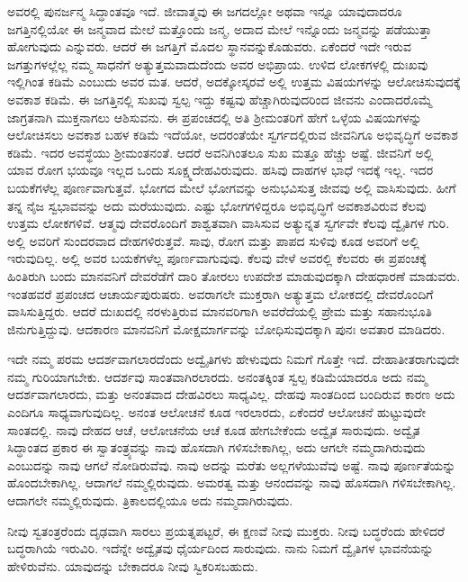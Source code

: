 ಅವರಲ್ಲಿ ಪುನರ್ಜನ್ಮ ಸಿದ್ಧಾಂತವೂ ಇದೆ. ಜೀವಾತ್ಮವು ಈ ಜಗದಲ್ಲೋ ಅಥವಾ ಇನ್ನೂ ಯಾವುದಾದರೂ ಜಗತ್ತಿನಲ್ಲಿಯೋ ಈ ಜನ್ಮವಾದ ಮೇಲೆ ಮತ್ತೊಂದು ಜನ್ಮ, ಅದಾದ ಮೇಲೆ ಇನ್ನೊಂದು ಜನ್ಮವನ್ನು ಪಡೆಯುತ್ತಾ ಹೋಗುವುದು ಎನ್ನುವರು. ಆದರೆ ಈ ಜಗತ್ತಿಗೆ ಮೊದಲ ಸ್ಥಾನವನ್ನುಕೊಡುವರು. ಏಕೆಂದರೆ ಇದೇ ಇರುವ ಜಗತ್ತುಗಳಲ್ಲೆಲ್ಲ ನಮ್ಮ ಸಾಧನೆಗೆ ಅತ್ಯುತ್ತಮವಾದುದೆಂದು ಅವರ ಅಭಿಪ್ರಾಯ. ಉಳಿದ ಲೋಕಗಳಲ್ಲಿ ದುಃಖವು ಇಲ್ಲಿಗಿಂತ ಕಡಿಮೆ ಎಂಬುದು ಅವರ ಮತ. ಆದರೆ, ಅದಕ್ಕೋಸ್ಕರವೆ ಅಲ್ಲಿ ಉತ್ತಮ ವಿಷಯಗಳನ್ನು ಆಲೋಚಿಸುವುದಕ್ಕೆ ಅವಕಾಶ ಕಡಿಮೆ. ಈ ಜಗತ್ತಿನಲ್ಲಿ ಸುಖವು ಸ್ವಲ್ಪ ಇದ್ದು ಕಷ್ಟವು ಹೆಚ್ಚಾಗಿರುವುದರಿಂದ ಜೀವನು ಎಂದಾದರೊಮ್ಮೆ ಜಾಗ್ರತನಾಗಿ ಮುಕ್ತನಾಗಲು ಆಶಿಸುವನು. ಈ ಪ್ರಪಂಚದಲ್ಲಿ ಅತಿ ಶ‍್ರೀಮಂತರಿಗೆ ಹೇಗೆ ಒಳ್ಳೆಯ ವಿಷಯಗಳನ್ನು ಆಲೋಚಿಸಲು ಅವಕಾಶ ಬಹಳ ಕಡಿಮೆ ಇದೆಯೋ, ಅದರಂತೆಯೇ ಸ್ವರ್ಗದಲ್ಲಿರುವ ಜೀವನಿಗೂ ಅಭಿವೃದ್ಧಿಗೆ ಅವಕಾಶ ಕಡಿಮೆ. ಇದರ ಅವಸ್ಥೆಯು ಶ‍್ರೀಮಂತನಂತೆ. ಆದರೆ ಅವನಿಗಿಂತಲೂ ಸುಖ ಮತ್ತೂ ಹೆಚ್ಚು ಅಷ್ಟೆ. ಜೀವನಿಗೆ ಅಲ್ಲಿ ಯಾವ ರೋಗ ಭಯವೂ ಇಲ್ಲದ ಒಂದು ಸೂಕ್ಷ್ಮದೇಹವಿರುವುದು. ಹಸಿವು ದಾಹಗಳ ಭಾಧೆ ಇದಕ್ಕೆ ಇಲ್ಲ. ಇದರ ಬಯಕೆಗಳೆಲ್ಲ ಪೂರ್ಣವಾಗುತ್ತವೆ. ಭೋಗದ ಮೇಲೆ ಭೋಗವನ್ನು ಅನುಭವಿಸುತ್ತ ಜೀವವು ಅಲ್ಲಿ ವಾಸಿಸುವುದು. ಹೀಗೆ ತನ್ನ ನೈಜ ಸ್ವಭಾವವನ್ನು ಅದು ಮರೆಯುವುದು. ಎಷ್ಟು ಭೋಗಗಳಿದ್ದರೂ ಅಭಿವೃದ್ಧಿಗೆ ಅವಕಾಶವಿರುವ ಕೆಲವು ಉತ್ತಮ ಲೋಕಗಳಿವೆ. ಆತ್ಮವು ದೇವರೊಂದಿಗೆ ಶಾಶ್ವತವಾಗಿ ವಾಸಿಸುವ ಅತ್ಯುನ್ನತ ಸ್ವರ್ಗವೇ ಕೆಲವು ದ್ವೈತಿಗಳ ಗುರಿ. ಅಲ್ಲಿ ಅವರಿಗೆ ಸುಂದರವಾದ ದೇಹಗಳಿರುತ್ತವೆ. ಸಾವು, ರೋಗ ಮತ್ತು ಪಾಪದ ಸುಳಿವು ಕೂಡ ಅವರಿಗೆ ಅಲ್ಲಿ ಇರುವುದಿಲ್ಲ. ಅಲ್ಲಿ ಅವರ ಬಯಕೆಗಳೆಲ್ಲ ಪೂರ್ಣವಾಗುವುವು. ಕೆಲವು ವೇಳೆ ಅವರಲ್ಲಿ ಕೆಲವರು ಈ ಪ್ರಪಂಚಕ್ಕೆ ಹಿಂತಿರುಗಿ ಬಂದು ಮಾನವನಿಗೆ ದೇವರೆಡೆಗೆ ದಾರಿ ತೋರಲು ಉಪದೇಶ ಮಾಡುವುದಕ್ಕಾಗಿ ದೇಹಧಾರಣೆ ಮಾಡುವರು. ಇಂತಹವರೆ ಪ್ರಪಂಚದ ಆಚಾರ್ಯಪುರುಷರು. ಅವರಾಗಲೇ ಮುಕ್ತರಾಗಿ ಅತ್ಯುತ್ತಮ ಲೋಕದಲ್ಲಿ ದೇವರೊಂದಿಗೆ ವಾಸಿಸುತ್ತಿದ್ದರು. ಆದರೆ ದುಃಖದಲ್ಲಿ ನರಳುತ್ತಿರುವ ಮಾನವರಿಗಾಗಿ ಅವರೆದೆಯಲ್ಲಿ ಪ್ರೇಮ ಮತ್ತು ಸಹಾನುಭೂತಿ ಜಿನುಗುತ್ತಿದ್ದುವು. ಆದಕಾರಣ ಮಾನವನಿಗೆ ಮೋಕ್ಷಮಾರ್ಗವನ್ನು ಬೋಧಿಸುವುದಕ್ಕಾಗಿ ಪುನಃ ಅವತಾರ ಮಾಡಿದರು. 

\vskip 5pt

ಇದೇ ನಮ್ಮ ಪರಮ ಆದರ್ಶವಾಗಲಾರದೆಂದು ಅದ್ವೈತಿಗಳು ಹೇಳುವುದು ನಿಮಗೆ ಗೊತ್ತೇ ಇದೆ. ದೇಹಾತೀತರಾಗುವುದೇ ನಮ್ಮ ಗುರಿಯಾಗಬೇಕು. ಆದರ್ಶವು ಸಾಂತವಾಗಿರಲಾರದು. ಅನಂತಕ್ಕಿಂತ ಸ್ವಲ್ಪ ಕಡಿಮೆಯಾದರೂ ಅದು ನಮ್ಮ ಆದರ್ಶವಾಗಲಾರದು, ಮತ್ತು ಅನಂತವಾದ ದೇಹವಿರಲು ಸಾಧ್ಯವಿಲ್ಲ. ದೇಹವು ಸಾಂತದಿಂದ ಬಂದಿರುವ ಕಾರಣ ಅದು ಎಂದಿಗೂ ಸಾಧ್ಯವಾಗುವುದಿಲ್ಲ. ಅನಂತ ಆಲೋಚನೆ ಕೂಡ ಇರಲಾರದು, ಏಕೆಂದರೆ ಆಲೋಚನೆ ಹುಟ್ಟುವುದೇ ಸಾಂತದಲ್ಲಿ. ನಾವು ದೇಹದ ಆಚೆ, ಆಲೋಚನೆಯ ಆಚೆ ಕೂಡ ಹೇಗಬೇಕೆಂದು ಅದ್ವೈತ ಸಾರುವುದು. ಅದ್ವೈತ ಸಿದ್ಧಾಂತದ ಪ್ರಕಾರ ಈ ಸ್ವಾತಂತ್ರ್ಯವನ್ನು ನಾವು ಹೊಸದಾಗಿ ಗಳಿಸಬೇಕಾಗಿಲ್ಲ, ಅದು ಆಗಲೇ ನಮ್ಮದಾಗಿರುವುದು ಎಂಬುದನ್ನು ನಾವು ಆಗಲೆ ನೋಡಿರುವೆವು. ನಾವು ಅದನ್ನು ಮರೆತು ಅಲ್ಲಗಳೆಯುವೆವು ಅಷ್ಟೆ. ನಾವು ಪೂರ್ಣತೆಯನ್ನು ಹೊಂದಬೇಕಾಗಿಲ್ಲ. ಆದಾಗಲೆ ನಮ್ಮಲ್ಲಿರುವುದು. ಅಮರತ್ವ ಮತ್ತು ಆನಂದವನ್ನು ನಾವು ಹೊಸದಾಗಿ ಗಳಿಸಬೇಕಾಗಿಲ್ಲ. ಆದಾಗಲೇ ನಮ್ಮಲ್ಲಿರುವುದು. ತ್ರಿಕಾಲದಲ್ಲಿಯೂ ಅದು ನಮ್ಮದಾಗಿರುವುದು. 

\vskip 5pt

ನೀವು ಸ್ವತಂತ್ರರೆಂದು ದೃಢವಾಗಿ ಸಾರಲು ಪ್ರಯತ್ನಪಟ್ಟರೆ, ಈ ಕ್ಷಣವೆ ನೀವು ಮುಕ್ತರು. ನೀವು ಬದ್ಧರೆಂದು ಹೇಳಿದರೆ ಬದ್ಧರಾಗಿಯೆ ಇರುವಿರಿ. ಇದೆನ್ನೇ ಅದ್ವೈತವು ಧೈರ್ಯದಿಂದ ಸಾರುವುದು. ನಾನು ನಿಮಗೆ ದ್ವೈತಿಗಳ ಭಾವನೆಯನ್ನು ಹೇಳಿರುವೆನು. ಯಾವುದನ್ನು ಬೇಕಾದರೂ ನೀವು ಸ್ವಿಕರಿಸಬಹುದು. 

